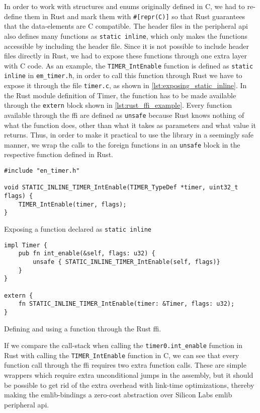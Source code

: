In order to work with structures and enums originally defined in C, we had to re-define them in Rust
and mark them with \texttt{\#[repr(C)]} so that Rust guarantees that the data-elements are C
compatible. The header files in the peripheral \gls{api} also defines many functions as
\texttt{static inline}, which only makes the functions accessible by including the header file.
Since it is not possible to include header files directly in Rust, we had to expose these functions
through one extra layer with C code. As an example, the \texttt{TIMER\_IntEnable} function is defined
as \texttt{static inline} in \texttt{em\_timer.h}, in order to call this function through Rust we
have to expose it through the file \texttt{timer.c}, as shown in
\autoref{lst:exposing_static_inline}. In the Rust module definition of Timer, the function has to
be made available through the \texttt{extern} block shown in \autoref{lst:rust_ffi_example}. Every
function available through the \gls{ffi} are defined as \texttt{unsafe} because Rust knows nothing
of what the function does, other than what it takes as parameters and what value it returns. Thus,
in order to make it practical to use the library in a seemingly safe manner, we wrap the calls to
the foreign functions in an \texttt{unsafe} block in the respective function defined in Rust.

\begin{listing}[tb]
\begin{verbatim}
#include "en_timer.h"

void STATIC_INLINE_TIMER_IntEnable(TIMER_TypeDef *timer, uint32_t flags) {
    TIMER_IntEnable(timer, flags);
}
\end{verbatim}
\caption{Exposing a function declared as \texttt{static inline}}
\label{lst:exposing_static_inline}
\end{listing}


\begin{listing}[tb]
\begin{verbatim}
impl Timer {
    pub fn int_enable(&self, flags: u32) {
        unsafe { STATIC_INLINE_TIMER_IntEnable(self, flags)}
    }
}

extern {
    fn STATIC_INLINE_TIMER_IntEnable(timer: &Timer, flags: u32);
}
\end{verbatim}
\caption{Defining and using a function through the Rust \gls{ffi}.}
\label{lst:rust_ffi_example}
\end{listing}

If we compare the call-stack when calling the \texttt{timer0.int\_enable} function in Rust with
calling the \texttt{TIMER\_IntEnable} function in C, we can see that every function call through the
\gls{ffi} requires two extra function calls. These are simple wrappers which require extra
unconditional jumps in the assembly, but it should be possible to get rid of the extra overhead
with link-time optimizations, thereby making the emlib-bindings a zero-cost abstraction over
Silicon Labs emlib peripheral \gls{api}.

